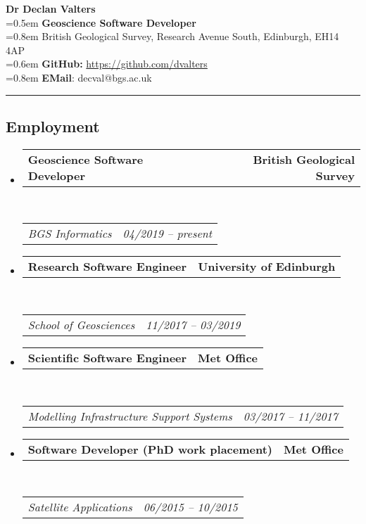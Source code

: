 \documentclass[10.5pt,a4]{article}
\makeatletter
\newcommand{\headerrow}[2]
{\begin{tabular*}{\linewidth}{l@{\extracolsep{\fill}}r}
	#1 &
	#2 \\
\end{tabular*}}
\makeatother
\begin{document}
\begin{flushleft}
{\LARGE \textbf{Dr Declan Valters}} \\
\parskip=0.5em
{\textbf{\large{Geoscience Software Developer}} \\ 
\parskip=0.8em
British Geological Survey, Research Avenue South, Edinburgh, EH14 4AP} \\
\parskip=0.6em
\textbf{GitHub:} \url{https://github.com/dvalters} \\ 
\parskip=0.8em 
\textbf{EMail}: decval@bgs.ac.uk
\end{flushleft}



\hrule
\vspace{-0.4em}


\subsection*{Employment}
\begin{itemize}
	\parskip=0.1em

	\item
	\headerrow
		{\textbf{Geoscience Software Developer}}
		{\textbf{British Geological Survey}}
	\\
	\headerrow
		{\emph{BGS Informatics}}
		{\emph{04/2019 -- present}}

	\item
	\headerrow
		{\textbf{Research Software Engineer}}
		{\textbf{University of Edinburgh}}
	\\
	\headerrow
		{\emph{School of Geosciences}}
		{\emph{11/2017 -- 03/2019}}

	\item
	\headerrow
		{\textbf{Scientific Software Engineer}}
		{\textbf{Met Office}}
	\\
	\headerrow
		{\emph{Modelling Infrastructure Support Systems}}
		{\emph{03/2017 -- 11/2017}}

	\item
	\headerrow
		{\textbf{Software Developer (PhD work placement)}}
		{\textbf{Met Office}}
	\\
	\headerrow
		{\emph{Satellite Applications}}
		{\emph{06/2015 -- 10/2015}}

\end{itemize}
\end{document}
